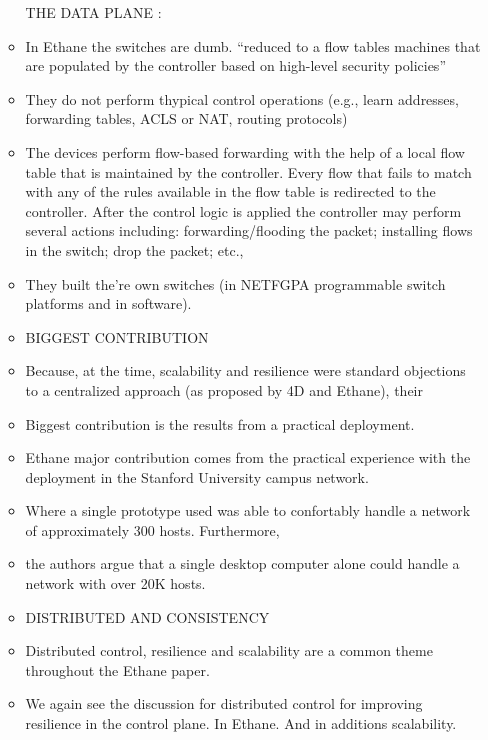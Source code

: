 \begin{itemize}
\begin{itemize}
THE DATA PLANE : 
\item In Ethane the switches are dumb. ``reduced to a flow tables machines that are populated by the controller based on high-level security policies''
\item They do not perform thypical control operations (e.g., learn addresses, forwarding tables, ACLS or NAT, routing protocols)

\item The devices perform  flow-based
forwarding  with the help of a local  flow table that is maintained by the
controller. Every flow that fails to match with any of the rules
available in the flow table  is redirected to the controller. After the
control logic is applied the controller may perform several actions
including: forwarding/flooding the packet;  installing flows in the
switch;  drop the packet; etc., 
\item They built the're own switches (in NETFGPA programmable switch platforms and in software). 

\item BIGGEST CONTRIBUTION 
\item Because, at the time, scalability and resilience were standard objections to a centralized approach (as proposed by 4D and Ethane), their 
\item Biggest contribution is the results from a practical deployment. 
\item Ethane major contribution comes from the practical  experience with
the deployment in the Stanford University  campus network. 
\item Where a single prototype used was able to confortably handle a network of approximately 300 hosts. Furthermore, 
\item the  authors argue that a single desktop computer alone could handle a network with over 20K hosts. 


\item DISTRIBUTED AND CONSISTENCY
\item Distributed control, resilience and scalability are a common theme throughout the Ethane paper. 
\item We again see the discussion  for distributed control for improving resilience in the control plane. In Ethane. And in additions scalability.


\end{itemize}
\end{itemize}
